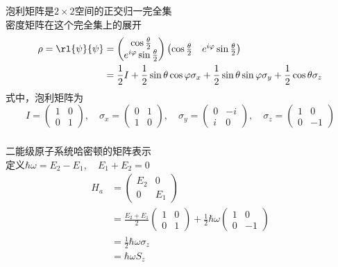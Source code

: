 \begin{frame} 
    \frametitle{}
    泡利矩阵是$2\times 2$空间的正交归一完全集 \\
    密度矩阵在这个完全集上的展开
    \[\begin{aligned}
        \rho =\rl{\psi}{\psi} 
    &=
    \begin{pmatrix}
        \cos\frac{\theta}{2}\\
        e^{i\varphi} \sin\frac{\theta}{2}
    \end{pmatrix}
    \begin{pmatrix}
        \cos\frac{\theta}{2} & e^{i\varphi} \sin\frac{\theta}{2}
    \end{pmatrix}
 \\
    &= \frac{1}{2}I +\frac{1}{2}\sin\theta\cos\varphi\sigma_x +\frac{1}{2}\sin\theta\sin\varphi\sigma_y+ \frac{1}{2}\cos\theta\sigma_z 
\end{aligned}\]
式中，泡利矩阵为
\[
I= \begin{pmatrix}
    1 & 0 \\
    0 & 1 
\end{pmatrix}, \quad
\sigma_x =
\begin{pmatrix}
    0 & 1 \\
    1 & 0 
\end{pmatrix}, \quad
\sigma_y =
\begin{pmatrix}
    0 & -i \\
    i & 0 
\end{pmatrix}, \quad
\sigma_z =
\begin{pmatrix}
    1 & 0 \\
    0 & -1 
\end{pmatrix}
\]
\end{frame}

\begin{frame} 
\frametitle{}
{\Bullet}二能级原子系统哈密顿的矩阵表示 \\ 
  定义$\hbar\omega= E_2-E_1, \quad  E_1+ E_2= 0 $
   \[\begin{aligned}
    H_a &= \begin{pmatrix}
        E_2 & 0\\ 
        0 & E_1 
     \end{pmatrix} \\
     &= \frac{E_2+E_1}{2} \begin{pmatrix}
        1 & 0\\ 
        0 & 1 
     \end{pmatrix} 
      + \frac{1}{2}\hbar \omega  \begin{pmatrix}
        1 & 0\\ 
        0 & -1 
     \end{pmatrix} \\
      &= \frac{1}{2}\hbar \omega \sigma_z  \\ 
      &= \hbar \omega S_z
    \end{aligned} \]   
\end{frame}

